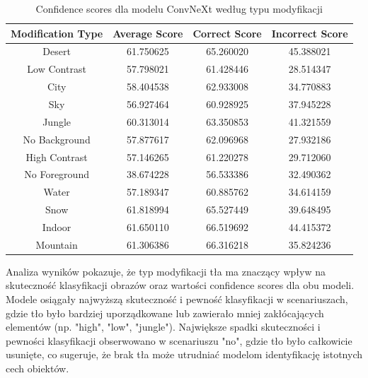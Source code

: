 \begin{table}
	\centering
	\begin{tabular}{|c|c|c|c|}
		\hline
		\textbf{Modification Type} & \textbf{Average Score} & \textbf{Correct Score} & \textbf{Incorrect Score} \\
		\hline
		Desert & 61.750625 & 65.260020 & 45.388021 \\
		\hline
		Low Contrast & 57.798021 & 61.428446 & 28.514347 \\
		\hline
		City & 58.404538 & 62.933008 & 34.770883 \\
		\hline
		Sky & 56.927464 & 60.928925 & 37.945228 \\
		\hline
		Jungle & 60.313014 & 63.350853 & 41.321559 \\
		\hline
		No Background & 57.877617 & 62.096968 & 27.932186 \\
		\hline
		High Contrast & 57.146265 & 61.220278 & 29.712060 \\
		\hline
		No Foreground & 38.674228 & 56.533386 & 32.490362 \\
		\hline
		Water & 57.189347 & 60.885762 & 34.614159 \\
		\hline
		Snow & 61.818994 & 65.527449 & 39.648495 \\
		\hline
		Indoor & 61.650110 & 66.519692 & 44.415372 \\
		\hline
		Mountain & 61.306386 & 66.316218 & 35.824236 \\
		\hline
	\end{tabular}
	\caption{Confidence scores dla modelu ConvNeXt według typu modyfikacji}
	\label{tab:convnext_confidence_scores_modification}
\end{table}

Analiza wyników pokazuje, że typ modyfikacji tła ma znaczący wpływ na skuteczność klasyfikacji obrazów oraz wartości confidence scores dla obu 
modeli. Modele osiągały najwyższą skuteczność i pewność klasyfikacji w scenariuszach, gdzie tło było bardziej uporządkowane lub zawierało mniej 
zakłócających elementów (np. "high", "low", "jungle"). Największe spadki skuteczności i pewności klasyfikacji obserwowano w scenariuszu "no", 
gdzie tło było całkowicie usunięte, co sugeruje, że brak tła może utrudniać modelom identyfikację istotnych cech obiektów.

